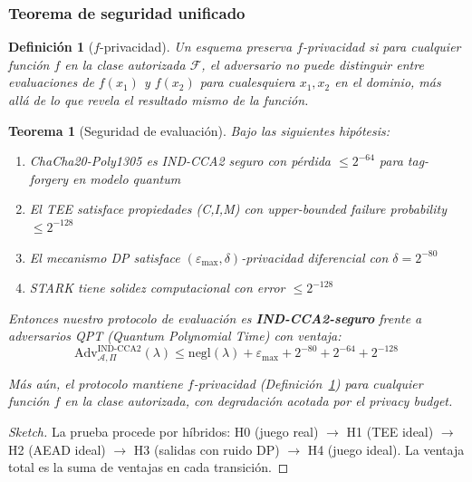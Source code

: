 \documentclass[11pt]{article}
\theoremstyle{plain}
\newtheorem{theorem}{Teorema}
\newtheorem{definition}{Definición}
\begin{document}
\subsubsection{Teorema de seguridad unificado}

\begin{definition}[$f$-privacidad]
\label{def:f-privacy}
Un esquema preserva $f$-privacidad si para cualquier función $f$ en la clase autorizada $\mathcal{F}$, el adversario no puede distinguir entre evaluaciones de $f(x_1)$ y $f(x_2)$ para cualesquiera $x_1, x_2$ en el dominio, más allá de lo que revela el resultado mismo de la función.
\end{definition}

\begin{theorem}[Seguridad de evaluación]
\label{thm:eval-security}
Bajo las siguientes hipótesis:
\begin{enumerate}
    \item ChaCha20-Poly1305 es IND-CCA2 seguro con pérdida $\leq 2^{-64}$ para tag-forgery en modelo quantum
    \item El TEE satisface propiedades (C,I,M) con upper-bounded failure probability $\leq 2^{-128}$
    \item El mecanismo DP satisface $(\varepsilon_{\text{max}}, \delta)$-privacidad diferencial con $\delta = 2^{-80}$
    \item STARK tiene solidez computacional con error $\leq 2^{-128}$
\end{enumerate}

Entonces nuestro protocolo de evaluación es \textbf{IND-CCA2-seguro} frente a adversarios QPT (Quantum Polynomial Time) con ventaja:
\begin{equation}
\text{Adv}_{\mathcal{A},\Pi}^{\text{IND-CCA2}}(\lambda) \leq \text{negl}(\lambda) + \varepsilon_{\text{max}} + 2^{-80} + 2^{-64} + 2^{-128}
\end{equation}

Más aún, el protocolo mantiene $f$-privacidad (Definición~\ref{def:f-privacy}) para cualquier función $f$ en la clase autorizada, con degradación acotada por el privacy budget.
\end{theorem}

\begin{proof}[Sketch]
La prueba procede por híbridos: H0 (juego real) $\rightarrow$ H1 (TEE ideal) $\rightarrow$ H2 (AEAD ideal) $\rightarrow$ H3 (salidas con ruido DP) $\rightarrow$ H4 (juego ideal). La ventaja total es la suma de ventajas en cada transición.
\end{proof}
\end{document}
